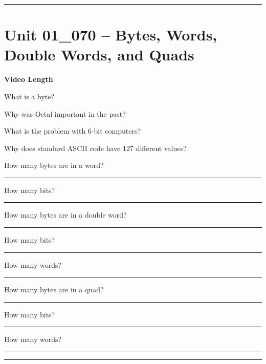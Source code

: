 \documentclass[letterpaper,12pt]{exam}
\newcommand{\unit}{Unit 01}
\begin{document}
\begin{questions}
\rule{0.5\textwidth}{.4pt} %

\section*{\unit\_070 -- Bytes, Words, Double Words, and Quads}
\par{\selectfont\textbf{Video Length }}

\begin{samepage}
    \question What is a byte?
    \vspace{5mm}
\end{samepage}
\par
 

\begin{samepage}
    \question Why was Octal important in the past?
    \vspace{5mm}
\end{samepage}

\begin{samepage}
    \question What is the problem with 6-bit computers?
    \vspace{5mm}
\end{samepage}
\par
 \begin{samepage}
     \question Why does standard ASCII code have 127 different values?
     \vspace{5mm}
 \end{samepage}
 \par
 \begin{samepage}
     \question How many bytes are in a word? \rule{2cm}{0.15mm} How many bits? \rule{2cm}{0.15mm}
     \vspace{5mm}
 \end{samepage}
  \begin{samepage}
     \question How many bytes are in a double word? \rule{2cm}{0.15mm} How many bits? \rule{2cm}{0.15mm} How many words? \rule{2cm}{0.15mm}
     \vspace{5mm}
 \end{samepage}
 \begin{samepage}
     \question How many bytes are in a quad? \rule{2cm}{0.15mm} How many bits? \rule{2cm}{0.15mm} How many words? \rule{2cm}{0.15mm}
     \vspace{5mm}
 \end{samepage} 
  
\rule{0.5\textwidth}{.4pt} %


\end{questions}
\end{document}
